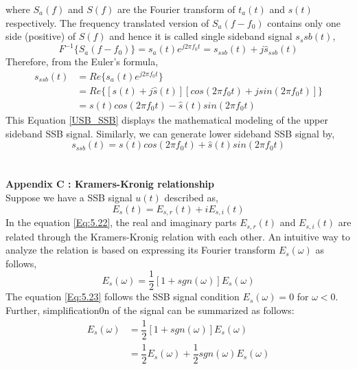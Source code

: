 where ${S_a}(f)$ and ${S}(f)$ are the Fourier transform of ${t_a}(t)$ and ${s}(t)$ respectively. The frequency translated version of ${S_a}(f-f_0)$ contains only one side (positive) of ${S}(f)$ and hence it is called single sideband signal ${s_ssb}(t)$,
\begin{equation}
{F}^{-1}\{S_a(f-f_0)\}={s_a}(t) e^{j2\pi f_0 t}={s_{ssb}}(t)+j{\hat{s}_{ssb}(t)}
\end{equation}
Therefore, from the Euler's formula,
\begin{equation}
\begin{split}
{s}_{ssb}(t)&=Re\{s_a(t)  e^{j2\pi f_0 t}\}\\
&=Re\{[s(t)+j\hat{s}(t)] [cos(2\pi f_0t)+jsin(2\pi f_0t)]\}\\
&=s(t)cos(2\pi f_0t)-\hat{s}(t)sin(2\pi f_0t)
\end{split}
\label{USB_SSB}
\end{equation}
This Equation \ref{USB_SSB} displays the mathematical modeling of the upper sideband SSB signal. Similarly, we can generate lower sideband SSB signal by,
\begin{equation}
{s}_{ssb}(t)=s(t)cos(2\pi f_0t)+\hat{s}(t)sin(2\pi f_0t)
\label{LSB_SSB}
\end{equation}\\
\\
\textbf{Appendix C : Kramers-Kronig relationship}\\
Suppose we have a SSB signal $u(t)$ described as,
\begin{equation}
E_s(t)=E_{s,r}(t)+iE_{s,i}(t)
\label{Eq:5.31}
\end{equation}
In the equation \ref{Eq:5.22}, the real and imaginary parts $E_{s,r}(t)$ and $E_{s,i}(t)$ are related through the Kramers-Kronig relation with each other. An intuitive way to analyze the relation is based on expressing its Fourier transform $E_s(\omega)$ as follows,
\begin{equation}
E_s(\omega)=\dfrac{1}{2}[1+sgn(\omega)]E_s(\omega)
\label{Eq:5.23}
\end{equation}
The equation \ref{Eq:5.23} follows the SSB signal condition $E_s(\omega)=0$ for $\omega<0$. Further, simplification0n of the signal can be summarized as follows:
\begin{equation}
\begin{split}
E_s(\omega)&=\dfrac{1}{2}[1+sgn(\omega)]E_s(\omega)\\
&=\dfrac{1}{2}E_s(\omega)+\dfrac{1}{2}sgn(\omega)E_s(\omega)
\end{split}
\label{Eq:5.33}
\end{equation}
